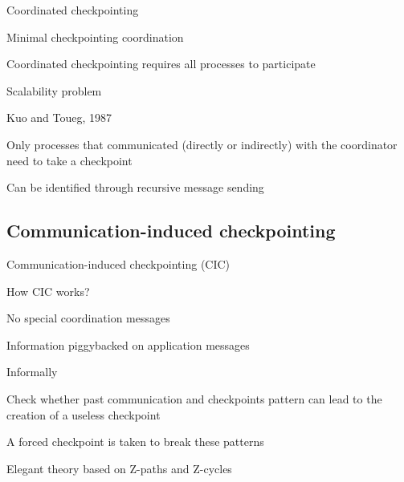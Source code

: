 \begin{frame}{Coordinated checkpointing}
\BI
\item Minimal checkpointing coordination
	\BI
	\item Coordinated checkpointing requires all processes to participate
	\item Scalability problem
	\EI
\item Kuo and Toueg, 1987
	\BI
	\item Only processes that communicated (directly or indirectly) with the coordinator need to take a checkpoint
	\item Can be identified through recursive message sending
	\EI
\EI
\end{frame}

\subsection{Communication-induced checkpointing}

\begin{frame}{Communication-induced checkpointing (CIC)}
\BI
\item How CIC works?
	\BI
	\item No special coordination messages
	\item Information piggybacked on application messages
	\EI
\item Informally
	\BI
	\item Check whether past communication and checkpoints pattern can lead to the creation of a useless checkpoint
	\item A forced checkpoint is taken to break these patterns
	\item Elegant theory based on \alert{Z-paths} and \alert{Z-cycles}	
	\EI
\EI
\end{frame}

